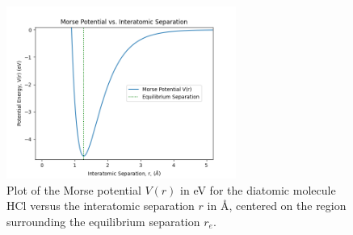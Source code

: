 \documentclass[%
aps, %
prl, %
preprint, %
12pt, %
amsfonts, %
amssymb, %
amsmath, %
endfloats,%
raggedbottom, %
]{revtex4-1}
\begin{document}
\begin{table}
\centering
\caption{\label{tab:MorseVals}Morse potential physical constants for the diatomic molecule HCl.}
\noindent{}
\end{table}

\begin{figure}
\centering
\includegraphics[width=0.67\textwidth]{morse_only.png}
\caption{\label{fig:MorseOnly} Plot of the Morse potential $V(r)$ in eV for the diatomic
molecule HCl versus the interatomic separation $r$ in Å, centered on the region surrounding the
equilibrium separation $r_e$.}
\end{figure}
\end{document}
